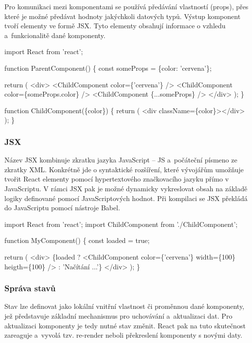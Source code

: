 Pro komunikaci mezi komponentami se používá předávání vlastností (props), přes které je možné předávat hodnoty jakýchkoli datových typů.
Výstup komponent tvoří elementy ve formě JSX. Tyto elementy obsahují informace o vzhledu a~funkcionalitě dané komponenty.\cite{reactbanks,react}

\begin{prog}
import React from 'react';

function ParentComponent() \{
  const someProps = \{color: 'cervena'\};

  return (
    <div>
      <ChildComponent color=\{'cervena'\} />
      <ChildComponent color=\{someProps.color\} />
      <ChildComponent \{...someProps\} />
    </div>
  );
\}

function ChildComponent(\{color\}) \{
  return (
    <div className=\{color\}></div>
  );
\}
\end{prog}

\subsubsection{JSX}

Název JSX kombinuje zkratku jazyka JavaScript -- JS a~počáteční písmeno ze zkratky XML. 
Konkrétně jde o syntaktické rozšíření, které vývojářům umožňuje tvořit React elementy pomocí hypertextového značkovacího jazyku přímo v JavaScriptu. 
V rámci JSX pak je možné dynamicky vykreslovat obsah na základě logiky definované pomocí JavaScriptových hodnot.
Při kompilaci se JSX překládá do JavaScriptu pomocí nástroje Babel.\cite{reactbanks,react}

\begin{prog}
import React from 'react';
import ChildComponent from './ChildComponent';

function MyComponent() \{
  const loaded = true;

  return (
    <div>
      \{loaded ? 
        <ChildComponent color=\{'cervena'\} width=\{100\} heigth=\{100\} /> 
        : 'Načítání ...'\}
    </div>
  );
\}
\end{prog}

\subsubsection{Správa stavů}

Stav lze definovat jako lokální vnitřní vlastnost či proměnnou dané komponenty, jež představuje základní mechanismus pro uchovávání a~aktualizaci dat. 
Pro aktualizaci komponenty je tedy nutné stav změnit. React pak na tuto skutečnost zareaguje a~vyvolá tzv. re-render neboli překreslení komponenty s novými daty.

